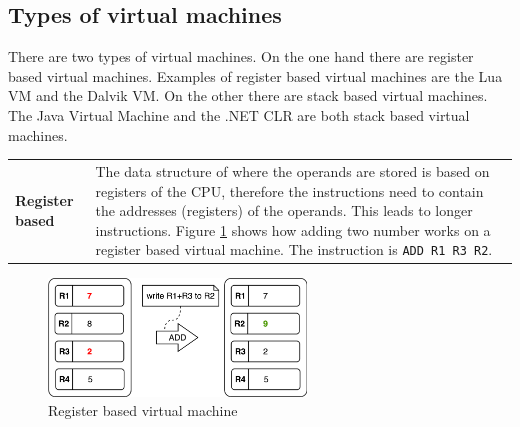 \subsection{Types of virtual machines}
There are two types of virtual machines. On the one hand there are register based virtual machines. Examples of register based virtual machines are the Lua VM and the Dalvik VM. On the other there are stack based virtual machines. The Java Virtual Machine and the .NET CLR are both stack based virtual machines. \cite{stackvsregistervm}

\begin{tabular}[t]{ p{3cm} p{12.5cm}}
\raggedright
\textbf{Register based} &
The data structure of where the operands are stored is based on registers of the CPU, therefore the instructions need to contain the addresses (registers) of the operands. This leads to longer instructions. Figure \ref{register vm} shows how adding two number works on a register based virtual machine. \cite{stackvsregistervm} The instruction is \texttt{ADD R1 R3 R2}.
\end{tabular}
\begin{figure}[H]
	\begin{center}
	\includegraphics[width=0.61\textwidth]{./images/register-example}
	\caption{Register based virtual machine}
	\label{register vm}
	\end{center}
\end{figure}

